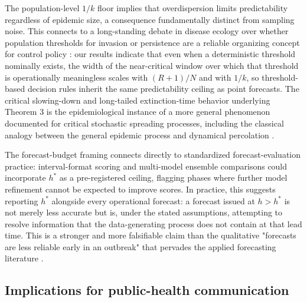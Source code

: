 \documentclass[review]{elsarticle}
\theoremstyle{plain}
\theoremstyle{definition}
\begin{document}
The population-level $1/k$ floor implies that overdispersion limits predictability regardless of epidemic size, a consequence fundamentally distinct from sampling noise. This connects to a long-standing debate in disease ecology over whether population thresholds for invasion or persistence are a reliable organizing concept for control policy \citep{lloydsmith2005should}: our results indicate that even when a deterministic threshold nominally exists, the width of the near-critical window over which that threshold is operationally meaningless scales with $(R+1)/N$ and with $1/k$, so threshold-based decision rules inherit the same predictability ceiling as point forecasts. The critical slowing-down and long-tailed extinction-time behavior underlying Theorem 3 is the epidemiological instance of a more general phenomenon documented for critical stochastic spreading processes, including the classical analogy between the general epidemic process and dynamical percolation \citep{grassberger1983critical}.





The forecast-budget framing connects directly to standardized forecast-evaluation practice: interval-format scoring \citep{bracher2021evaluating} and multi-model ensemble comparisons \citep{cramer2022evaluation} could incorporate $h^*$ as a pre-registered ceiling, flagging phases where further model refinement cannot be expected to improve scores. In practice, this suggests reporting $h^*$ alongside every operational forecast: a forecast issued at $h>h^*$ is not merely less accurate but is, under the stated assumptions, attempting to resolve information that the data-generating process does not contain at that lead time. This is a stronger and more falsifiable claim than the qualitative "forecasts are less reliable early in an outbreak" that pervades the applied forecasting literature \citep{desai2019realtime}.



\subsection{Implications for public-health communication}
\end{document}
